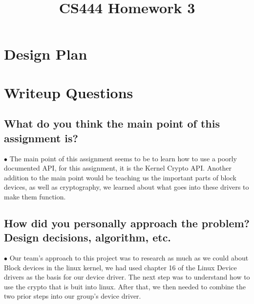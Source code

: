 \documentclass[letterpaper,10pt,fleqn,draftclsnofoot,onecolumn]{IEEEtran}
\title{CS444 Homework 3}
\author{\name}
\begin{document}
	\maketitle
	\hrulefill
	\section*{Design Plan}
	
	
	\section*{Writeup Questions}
	
	\subsection{What do you think the main point of this assignment is?}
	$\bullet$ The main point of this assignment seems to be to learn how to use a poorly documented API, for this assignment, it is the Kernel Crypto API. Another addition to the main point would be teaching us the important parts of block devices, as well as cryptography, we learned about what goes into these drivers to make them function. 
	
	\subsection{How did you personally approach the problem? Design decisions, algorithm, etc.}
	$\bullet$ Our team's approach to this project was to research as much as we could about Block devices in the linux kernel, we had used chapter 16 of the Linux Device drivers as the basis for our device driver. %
	The next step was to understand how to use the crypto that is buit into linux. After that, we then needed to combine the two prior steps into our group's device driver.
	
\end{document}
